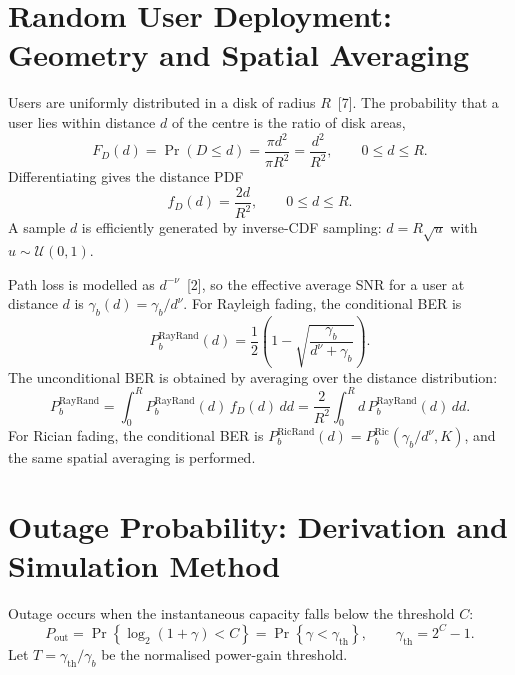 \documentclass[12pt,a4paper]{article}
\begin{document}
\section{Random User Deployment: Geometry and Spatial Averaging}\label{sec:random}
Users are uniformly distributed in a disk of radius $R$~[7]. The probability that a user lies within distance $d$ of the centre is the ratio of disk areas,
\begin{equation}
    F_D(d)=\Pr(D\le d)=\frac{\pi d^2}{\pi R^2}=\frac{d^2}{R^2},\qquad 0\le d\le R.
\end{equation}
Differentiating gives the distance PDF
\begin{equation}
    f_D(d)=\frac{2d}{R^2},\qquad 0\le d\le R.
\end{equation}
A sample $d$ is efficiently generated by inverse-CDF sampling: $d=R\sqrt{u}$ with $u\sim\mathcal{U}(0,1)$.

Path loss is modelled as $d^{-\nu}$~[2], so the effective average SNR for a user at distance $d$ is $\gamma_b(d)=\gamma_b/d^{\nu}$. For Rayleigh fading, the conditional BER is
\begin{equation}
    P_b^{\text{RayRand}}(d)=\frac{1}{2}\left(1-\sqrt{\frac{\gamma_b}{d^{\nu}+\gamma_b}}\right).
\end{equation}
The unconditional BER is obtained by averaging over the distance distribution:
\begin{equation}
    P_b^{\text{RayRand}}=\int_0^R P_b^{\text{RayRand}}(d)\,f_D(d)\,dd
    =\frac{2}{R^2}\int_0^R d\,P_b^{\text{RayRand}}(d)\,dd.
\end{equation}
For Rician fading, the conditional BER is $P_b^{\text{RicRand}}(d)=P_b^{\text{Ric}}(\gamma_b/d^{\nu},K)$, and the same spatial averaging is performed.

\section{Outage Probability: Derivation and Simulation Method}\label{sec:outage}
Outage occurs when the instantaneous capacity falls below the threshold $C$:
\begin{equation}
    P_{\text{out}}=\Pr\left\{\log_2(1+\gamma)<C\right\}
    =\Pr\left\{\gamma<\gamma_{\text{th}}\right\},
    \qquad \gamma_{\text{th}}=2^C-1.
\end{equation}
Let $T=\gamma_{\text{th}}/\gamma_b$ be the normalised power-gain threshold.
\end{document}
